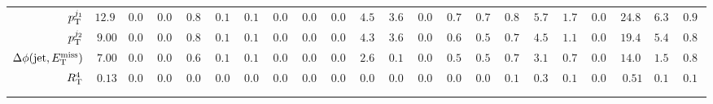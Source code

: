 \begin{table}
{\begin{tabular}{r|rrr|rrr|rrr|rrr|rrr|rrr|rrr}
       $p_{\mathrm{T}}^{j_1}$       &   $12.97$ & $0.00$ & $0.00$ &   $0.89$ &   $0.17$ &   $0.10$ &    $0.00$ &    $0.00$ &    $0.00$ &       $4.53$ &      $3.65$ & $0.00$ &  $0.74$ &  $0.79$ &   $0.87$ &   $5.72$ &   $1.72$ & $0.00$ &      $24.85$ &      $6.33$ &    $0.97$ \\
       $p_{\mathrm{T}}^{j_2}$       &    $9.00$ & $0.00$ & $0.00$ &   $0.87$ &   $0.17$ &   $0.10$ &    $0.00$ &    $0.00$ &    $0.00$ &       $4.34$ &      $3.60$ & $0.00$ &  $0.69$ &  $0.55$ &   $0.74$ &   $4.52$ &   $1.12$ & $0.00$ &      $19.42$ &      $5.44$ &    $0.84$ \\
       $\Delta \phi (\mathrm{jet},E_{\mathrm{T}}^{\mathrm{miss}})$         &    $7.00$ & $0.00$ & $0.00$ &   $0.65$ &   $0.17$ &   $0.10$ &    $0.00$ &    $0.00$ &    $0.00$ &       $2.67$ &      $0.10$ & $0.00$ &  $0.58$ &  $0.54$ &   $0.70$ &   $3.14$ &   $0.71$ & $0.00$ &      $14.05$ &      $1.52$ &    $0.80$ \\
       $R_{\mathrm{T}}^{4}$             &    $0.13$ & $0.00$ & $0.00$ &   $0.00$ &   $0.00$ &   $0.00$ &    $0.00$ &    $0.00$ &    $0.00$ &       $0.00$ &      $0.00$ & $0.00$ &  $0.04$ &  $0.00$ &   $0.12$ &   $0.34$ &   $0.12$ & $0.00$ &       $0.51$ &      $0.12$ &    $0.12$ \\
       \hline

       \multicolumn{22}{c}{} \\
       \multicolumn{22}{c}{} \\




\end{tabular}}
\end{table}

